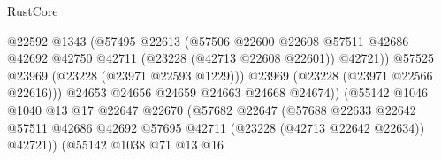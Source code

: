 \begin{lexlean}{RustCore}
\begin{coremodule}
                                              @22592
                                              @1343
                                              (@57495
                                                @22613
                                                (@57506
                                                  @22600
                                                  @22608
                                                  @57511
                                                  @42686
                                                  @42692
                                                  @42750
                                                  @42711
                                                  (@23228 (@42713 @22608 @22601))
                                                  @42721))
                                              @57525
                                              @23969
                                              (@23228 (@23971 @22593 @1229)))
                                            @23969
                                            (@23228 (@23971 @22566 @22616)))
                                          @24653
                                          @24656
                                          @24659
                                          @24663
                                          @24668
                                          @24674))
                                      (@55142
                                        @1046
                                        @1040
                                        @13
                                        @17
                                        @22647
                                        @22670
                                        (@57682
                                          @22647
                                          (@57688
                                            @22633
                                            @22642
                                            @57511
                                            @42686
                                            @42692
                                            @57695
                                            @42711
                                            (@23228 (@42713 @22642 @22634))
                                            @42721))
                                        (@55142
                                          @1038
                                          @71
                                          @13
                                          @16

\end{coremodule}
\end{lexlean}
